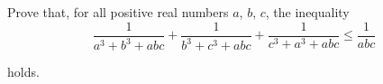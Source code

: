 Prove that, for all positive real numbers $ a$,  $ b$,  $ c$,  the inequality\[ \frac {1}{a^3 + b^3 + abc} + \frac {1}{b^3 + c^3 + abc} + \frac {1}{c^3 + a^3 + abc} \leq \frac {1}{abc}

\]

holds.